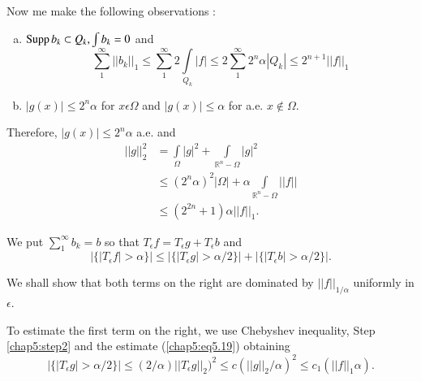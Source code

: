 Now me make the following observations :
\begin{enumerate}[a)]
\item $\operatorname{Supp} b_k \subset Q_k, \int b_k = 0$  and 
  \begin{equation*}
    \sum_{1}^{\infty} || b_k ||_1 \leq \sum_{1}^{\infty} 2
    \int\limits_{Q_k} |f| \leq 2 \sum_{1}^{\infty} 2^n \alpha |Q_k| \leq
    2^{n+1} || f ||_1 \tag{5.18}\label{chap5:eq5.18} 
  \end{equation*}\pageoriginale
\item  $| g (x) | \leq 2^n \alpha$ for $x \epsilon \Omega$ and
  $|g(x)| \leq \alpha$ for a.e. $x \notin \Omega$.
\end{enumerate}

Therefore,  $| g(x) | \leq 2^n \alpha$ a.e. and
\begin{align*}
  || g ||_2^2 & = \int\limits_{\Omega} |g | ^2 +
  \int\limits_{\mathbb{R}^n - \Omega} |g|^2 \tag{5.19}\label{chap5:eq5.19}\\ 
  & \leq (2^n \alpha )^2 |\Omega| + \alpha \int\limits_{\mathbb{R}^n -
    \Omega} || f ||\\ 
  & \leq (2^{2n} +1)\alpha || f ||_1.
\end{align*}

We put $\sum\limits_{1}^{\infty} b_k = b$ so that $T_{\epsilon}f =
T_{\epsilon}g + T_{\epsilon}b$ and  
$$
|\{| T_{\epsilon} f | > \alpha \} |\leq|\{| T_{\epsilon} g| >
\alpha/2\}|+|\{ | T_{\epsilon} b| > \alpha /2\}|. 
$$

We shall show that both terms on the right are dominated by $|| f ||
_{1/\alpha}$ uniformly in $\epsilon$. 

To estimate the first term on the right, we use Chebyshev inequality,
Step \ref{chap5:step2} and the estimate
(\ref{chap5:eq5.19}) obtaining  
$$
|\{| T_{\epsilon} g| > \alpha/2\}| \leq (2 /\alpha) ||
T_{\epsilon}g ||_2)^2 \leq  c (|| g ||_2 /\alpha )^2 \leq c_1 (|| f
||_1 \alpha). 
$$

